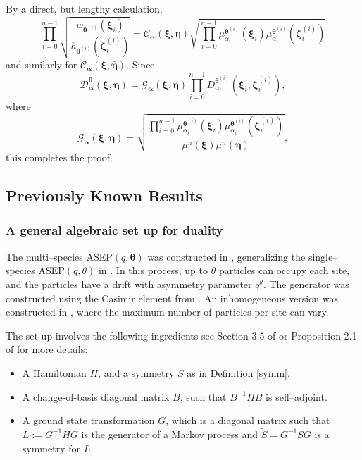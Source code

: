 \documentclass{ximera}
\begin{document}
By a direct, but lengthy calculation, 
$$
\prod_{i=0}^{n-1}\sqrt{\frac{w_{\boldsymbol\theta^{(i)}}(\boldsymbol\xi_i)}{h_{\boldsymbol\theta^{(i)}}(\boldsymbol\zeta^{(i)}_i)}}  = \mathcal{C}_{\boldsymbol\alpha}(\boldsymbol\xi,\boldsymbol\eta)  \sqrt{\prod_{i=0}^{n-1}\mu_{\alpha_i}^{\boldsymbol{\theta}^{(i)}}(\boldsymbol\xi_i)\mu_{\alpha_i}^{\boldsymbol{\theta}^{(i)}}(\boldsymbol\zeta^{(i)}_i)}
$$
and similarly for $\mathcal{C}_{\boldsymbol\alpha}(\boldsymbol\xi,\bar{\boldsymbol\eta}).$ Since
$$
\mathcal{D}^{\boldsymbol\theta}_{\boldsymbol{\alpha}}(\boldsymbol\xi, \boldsymbol\eta) =\mathcal{G}_{\boldsymbol{\alpha}}(\boldsymbol\xi,\boldsymbol\eta)\prod_{i=0}^{n-1}D^{  \boldsymbol{\theta}^{(i)} }_{\alpha_i}(\boldsymbol\xi_i, \boldsymbol\zeta^{(i)}_i)
 ,
$$
where 
$$
\mathcal{G}_{\boldsymbol{\alpha}}(\boldsymbol\xi,\boldsymbol\eta) = \sqrt{ \frac{ \prod_{i=0}^{n-1}\mu_{\alpha_i}^{\boldsymbol{\theta}^{(i)}}(\boldsymbol\xi_i)\mu_{\alpha_i}^{\boldsymbol{\theta}^{(i)}}(\boldsymbol\zeta^{(i)}_i)  }{\mu^{n}(\boldsymbol\xi) \mu^{n}(\boldsymbol\eta) }},$$
this completes the proof. 



\subsection{Previously Known Results}

\subsubsection{A general algebraic set up for duality}
The multi--species ASEP$(q,\boldsymbol\theta)$ was constructed in \cite{Kuan-IMRN}, generalizing the single--species ASEP$(q,\theta)$ in \cite{CGRS}. In this process, up to $\theta$ particles can occupy each site, and the particles have a drift with asymmetry parameter $q^{\theta}$. The generator was constructed using the Casimir element from \cite{REU2020}. An inhomogeneous version was constructed in \cite{KuanSF}, where the maximum number of particles per site can vary. 

The set-up involves the following ingredients see Section 3.5 of \cite{Kuan-IMRN} or Proposition 2.1 of \cite{CGRS} for more details:

\begin{itemize}
\item
A Hamiltonian $H$, and a symmetry $S$ as in Definition \ref{symm}.
\item
A change-of-basis diagonal matrix $B$, such that $B^{-1}HB$ is self--adjoint.
\item
A ground state transformation $G$, which is a diagonal matrix such that $L:=G^{-1}HG$ is the generator of a Markov process and $\tilde{S} = G^{-1}SG$ is a symmetry for $L$. 
\end{itemize}
\end{document}
